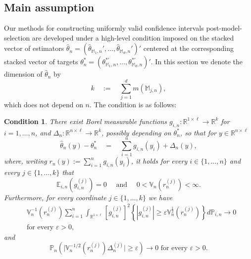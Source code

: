 \documentclass[preprint]{imsart}
\newcommand{\R}{{\mathbb R}}
\newcommand{\eps}{\varepsilon}
\newtheorem{condition}{Condition}
\numberwithin{equation}{section}
\begin{document}
\subsection{Main assumption}\label{sec:ass}

Our methods for constructing uniformly valid confidence intervals post-model-selection are developed under a high-level condition imposed on the stacked vector of estimators $\hat{\theta}_n = (\hat{\theta}_{\mathbb{M}_1, n}', \hdots, \hat{\theta}_{\mathbb{M}_d, n}')'$ centered at the corresponding stacked vector of targets $\theta_n^* = (\theta^{*'}_{\mathbb{M}_1, n}, \hdots, \theta^{*'}_{\mathbb{M}_d, n})'$. In this section we denote the dimension of $\hat{\theta}_n$ by 
$$k \quad := \quad \sum_{j = 1}^d m(\mathbb{M}_{j,n}),$$ 
which does not depend on $n$. The condition is as follows:
%
\begin{condition}\label{cond:sum}
There exist Borel measurable functions $g_{i,n}: \R^{1 \times \ell}\to \R^k$ for $i = 1, \hdots, n$, and $\Delta_n:\R^{n\times \ell}\to\R^k$, possibly depending on $\theta^*_n$, so that for $y\in\R^{n\times \ell}$
%
\begin{equation}\label{eq:repres}
\hat{\theta}_n(y) - \theta_n^*   \quad = \quad  \sum_{i = 1}^n g_{i,n}(y_i) + \Delta_n(y), 
\end{equation}
%
where, writing $r_n(y) := \sum_{i = 1}^n g_{i,n}(y_i)$, it holds for every $i \in \{1, \hdots, n\}$ and every $j \in \{1, \hdots, k\}$ that
%
\begin{equation}\label{eq:mom}
\mathbb{E}_{i,n}\left(g^{(j)}_{i,n}\right) = 0 \quad \text{ and } \quad 0 < \mathbb{V}_{n}\left(r_n^{(j)} \right) < \infty.
\end{equation}
%
Furthermore, for every coordinate $j \in \{1, \hdots, k\}$ we have
%
\begin{equation}\label{eq:linde}
\begin{aligned}
&\mathbb{V}_n^{-1}\left(r^{(j)}_n\right)\sum_{i = 1}^n \int_{\R^{1 \times \ell}} \left[g^{(j)}_{i, n}\right]^2 \left\{|g^{(j)}_{i, n}| \geq \varepsilon \mathbb{V}^{\frac{1}{2}}_n(r^{(j)}_n) \right\}  d\mathbb{P}_{i,n} \to 0 \\ &\text{for every } \eps > 0,
\end{aligned}
\end{equation}
%
and
%
\begin{equation*}
\mathbb{P}_n \left( \big|\mathbb{V}^{-1/2}_{n}\left(r_n^{(j)} \right) \Delta_n^{(j)} \big| \geq \eps  \right) \to 0 \text{ for every } \eps > 0.
\end{equation*}
%
\end{condition}
%
\end{document}
